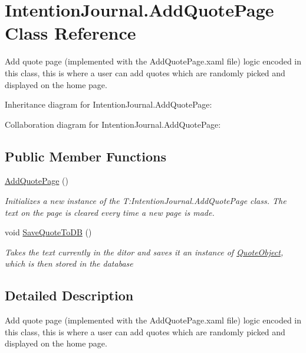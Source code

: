 \hypertarget{class_intention_journal_1_1_add_quote_page}{}\section{Intention\+Journal.\+Add\+Quote\+Page Class Reference}
\label{class_intention_journal_1_1_add_quote_page}


Add quote page (implemented with the Add\+Quote\+Page.\+xaml file) logic encoded in this class, this is where a user can add quotes which are randomly picked and displayed on the home page.  




Inheritance diagram for Intention\+Journal.\+Add\+Quote\+Page\+:


Collaboration diagram for Intention\+Journal.\+Add\+Quote\+Page\+:
\subsection*{Public Member Functions}
\begin{DoxyCompactItemize}
\item 
\hyperlink{class_intention_journal_1_1_add_quote_page_a0c3a505a6db7cf2098899daf3e379e0b}{Add\+Quote\+Page} ()
\begin{DoxyCompactList}\small\item\em Initializes a new instance of the T\+:\+Intention\+Journal.\+Add\+Quote\+Page class. The text on the page is cleared every time a new page is made. \end{DoxyCompactList}\item 
void \hyperlink{class_intention_journal_1_1_add_quote_page_a38b02a32de23eb5ab591304dca652ff1}{Save\+Quote\+To\+DB} ()
\begin{DoxyCompactList}\small\item\em Takes the text currently in the ditor and saves it an instance of \hyperlink{class_intention_journal_1_1_quote_object}{Quote\+Object}, which is then stored in the database \end{DoxyCompactList}\end{DoxyCompactItemize}


\subsection{Detailed Description}
Add quote page (implemented with the Add\+Quote\+Page.\+xaml file) logic encoded in this class, this is where a user can add quotes which are randomly picked and displayed on the home page. 




